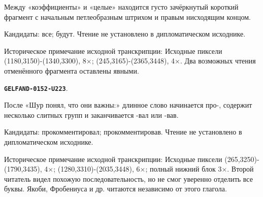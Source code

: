 \documentclass[11pt]{article}
\theoremstyle{definition}
\theoremstyle{remark}
\begin{document}
Между «коэффициенты» и «целые» находится густо зачёркнутый короткий фрагмент с начальным петлеобразным штрихом и правым нисходящим концом.\par
Кандидаты: все; будут. Чтение не установлено в дипломатическом исходнике.\par
Историческое примечание исходной транскрипции: Исходные пиксели (1180,3150)-(1340,3300), 8×; (245,3165)-(2365,3448), 4×. Два возможных чтения отменённого фрагмента оставлены явными.\par\medskip
\par\noindent\leavevmode{}\label{GELFAND-0152-U223}\label{GELFAND-P001400:last-line-verb:note}\textbf{\texttt{GELFAND-0152-U223}}.\nopagebreak[4]\par
После «Шур понял, что они важны:» длинное слово начинается про-, содержит несколько слитных групп и заканчивается -вал или -вав.\par
Кандидаты: прокомментировал; прокомментировав. Чтение не установлено в дипломатическом исходнике.\par
Историческое примечание исходной транскрипции: Исходные пиксели (265,3250)-(1790,3435), 4×; (1280,3310)-(2035,3448), 6×; полный нижний блок 3×. Второй читатель видел похожую последовательность, но не смог уверенно отделить все буквы. Якоби, Фробениуса и др. читаются независимо от этого глагола.\par\medskip
\end{document}
